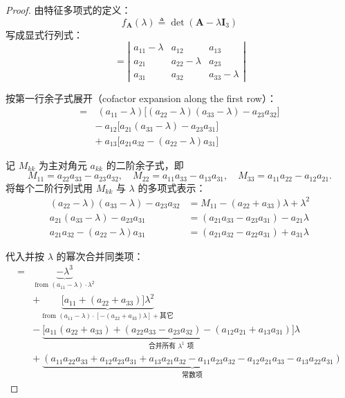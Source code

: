 \begin{proof}
    由特征多项式的定义：
    \[
    f_{\bm{A}}(\lambda) \triangleq \det(\bm{A}-\lambda\bm{I}_{3})
    \]
    写成显式行列式：
    \[
    =\left|\begin{array}{ccc}
    a_{11}-\lambda & a_{12} & a_{13} \\
    a_{21} & a_{22}-\lambda & a_{23} \\
    a_{31} & a_{32} & a_{33}-\lambda
    \end{array}\right|
    \]

    按第一行余子式展开（cofactor expansion along the first row）：
    \[
    \begin{aligned}
    =&\ (a_{11}-\lambda)\bigl[(a_{22}-\lambda)(a_{33}-\lambda) - a_{23}a_{32}\bigr] \\
    &-\ a_{12}\bigl[a_{21}(a_{33}-\lambda) - a_{23}a_{31}\bigr] \\
    &+\ a_{13}\bigl[a_{21}a_{32} - (a_{22}-\lambda)a_{31}\bigr]
    \end{aligned}
    \]

    记 $M_{kk}$ 为主对角元 $a_{kk}$ 的二阶余子式，即
    \[
    M_{11}=a_{22}a_{33}-a_{23}a_{32},\quad
    M_{22}=a_{11}a_{33}-a_{13}a_{31},\quad
    M_{33}=a_{11}a_{22}-a_{12}a_{21}.
    \]
    将每个二阶行列式用 $M_{kk}$ 与 $\lambda$ 的多项式表示：
    \[
    \begin{aligned}
    (a_{22}-\lambda)(a_{33}-\lambda) - a_{23}a_{32}
        &= M_{11} - (a_{22}+a_{33})\lambda + \lambda^{2} \\
    a_{21}(a_{33}-\lambda) - a_{23}a_{31}
        &= (a_{21}a_{33}-a_{23}a_{31}) - a_{21}\lambda \\
    a_{21}a_{32} - (a_{22}-\lambda)a_{31}
        &= (a_{21}a_{32}-a_{22}a_{31}) + a_{31}\lambda
    \end{aligned}
    \]

    代入并按 $\lambda$ 的幂次合并同类项：
    \[
    \begin{aligned}
    =&\ \underbrace{-\lambda^{3}}_{\text{from }(a_{11}-\lambda)\cdot\lambda^{2}} \\
    &+\ \underbrace{\bigl[a_{11}+(a_{22}+a_{33})\bigr]\lambda^{2}}_{\text{from }(a_{11}-\lambda)\cdot[-(\!a_{22}\!+\!a_{33}\!)\lambda]+\text{其它}} \\
    &-\ \underbrace{\bigl[a_{11}(a_{22}+a_{33})+(a_{22}a_{33}-a_{23}a_{32})-(a_{12}a_{21}+a_{13}a_{31})\bigr]\lambda}_{\text{合并所有 $\lambda^{1}$ 项}} \\
    &+\ \underbrace{(a_{11}a_{22}a_{33}+a_{12}a_{23}a_{31}+a_{13}a_{21}a_{32}-a_{11}a_{23}a_{32}-a_{12}a_{21}a_{33}-a_{13}a_{22}a_{31})}_{\text{常数项}}
    \end{aligned}
    \]


\end{proof}
